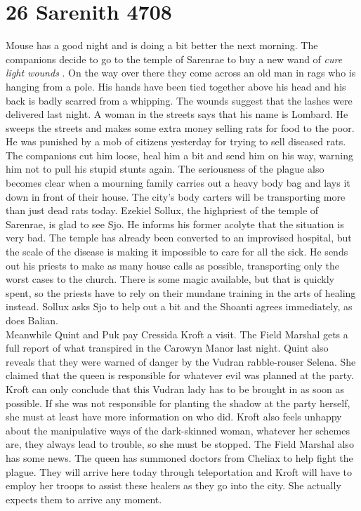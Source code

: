 \section{26 Sarenith 4708}

Mouse has a good night and is doing a bit better the next morning. The companions decide to go to the temple of Sarenrae to buy a new wand of {\itshape cure light wounds} . On the way over there they come across an old man in rags who is hanging from a pole. His hands have been tied together above his head and his back is badly scarred from a whipping. The wounds suggest that the lashes were delivered last night. A woman in the streets says that his name is Lombard. He sweeps the streets and makes some extra money selling rats for food to the poor. He was punished by a mob of citizens yesterday for trying to sell diseased rats. The companions cut him loose, heal him a bit and send him on his way, warning him not to pull his stupid stunts again. The seriousness of the plague also becomes clear when a mourning family carries out a heavy body bag and lays it down in front of their house. The city's body carters will be transporting more than just dead rats today. Ezekiel Sollux, the highpriest of the temple of Sarenrae, is glad to see Sjo. He informs his former acolyte that the situation is very bad. The temple has already been converted to an improvised hospital, but the scale of the disease is making it impossible to care for all the sick. He sends out his priests to make as many house calls as possible, transporting only the worst cases to the church. There is some magic available, but that is quickly spent, so the priests have to rely on their mundane training in the arts of healing instead. Sollux asks Sjo to help out a bit and the Shoanti agrees immediately, as does Balian.\\

Meanwhile Quint and Puk pay Cressida Kroft a visit. The Field Marshal gets a full report of what transpired in the Carowyn Manor last night. Quint also reveals that they were warned of danger by the Vudran rabble-rouser Selena. She claimed that the queen is responsible for whatever evil was planned at the party. Kroft can only conclude that this Vudran lady has to be brought in as soon as possible. If she was not responsible for planting the shadow at the party herself, she must at least have more information on who did. Kroft also feels unhappy about the manipulative ways of the dark-skinned woman, whatever her schemes are, they always lead to trouble, so she must be stopped. The Field Marshal also has some news. The queen has summoned doctors from Cheliax to help fight the plague. They will arrive here today through teleportation and Kroft will have to employ her troops to assist these healers as they go into the city. She actually expects them to arrive any moment.\\

